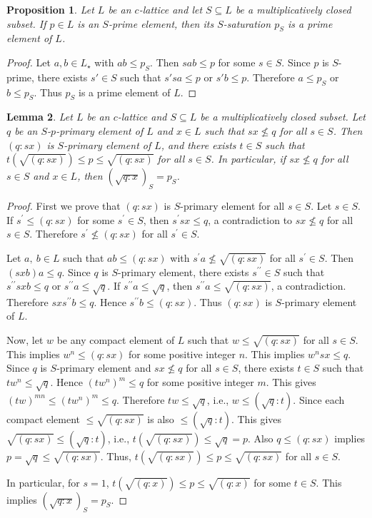 \documentclass[10pt,twoside,a4]{amsart}
\numberwithin{equation}{section}
\theoremstyle{plain}
\newtheorem{lem}{Lemma}[section]
\newtheorem{prop}[lem]{Proposition}
\theoremstyle{definition}
\begin{document}
\begin{prop}\label{ps-prime}
	Let $L$ be an $c$-lattice and let $S \subseteq L$ be a multiplicatively closed subset. If $p \in L$ is an $S$-prime element, then its $S$-saturation $p_S$ is a prime element of $L$.
\end{prop}
\begin{proof}
	Let $a,b\in L_{\star}$ with $ab\leq p_S$. Then $sab\leq p$ for some $s\in S$. Since $p$ is $S$-prime, there exists $s'\in S$ such that $s'sa\leq p$ or $s'b\leq p$. Therefore $a\leq p_S$ or $b\leq p_S$. Thus $p_S$ is a prime element of $L$.
\end{proof}


 \begin{lem}\label{radical=ps} 
	Let $L$ be an $c$-lattice and $S \subseteq L$ be a multiplicatively closed subset. Let $q$ be an $S$-$p$-primary element of $L$ and $x\in L$ such that $sx\nleq q$ for all $s\in S$. Then $(q:sx)$ is $S$-primary element of $L$, and there exists $t\in S$ such that $t(\sqrt{(q:sx)})\leq p\leq \sqrt{(q:sx)}$ for all $s\in S$. In particular, if $sx \not\leq q$ for all $s \in S$ and $x\in L$, then
	$(\sqrt{q : x})_S = p_S$.
\end{lem}

\begin{proof} 
	First we prove that $(q:sx)$ is $S$-primary element for all $s\in S$. Let $s\in S$. If $s^{\prime}\leq (q:sx)$ for some $s^{\prime}\in S$, then $s^{\prime}sx\leq q$, a contradiction to $sx\nleq q$ for all $s\in S$. Therefore $s^{\prime}\nleq (q:sx)$ for all $s^{\prime}\in S$. 
	
	Let $a, ~b \in L$ such that  $ab\leq (q:sx)$ with $s^{\prime}a\nleq \sqrt{(q:sx)}$ for all $s^{\prime}\in S$. Then $(sxb)a\leq q$. Since $q$ is \linebreak $S$-primary element, there exists $s^{\prime\prime}\in S$ such that $s^{\prime\prime}sxb\leq q$ or $s^{\prime\prime}a\leq \sqrt{q}$. If $s^{\prime\prime}a\leq \sqrt{q}$, then $s^{\prime\prime}a\leq \sqrt{(q:sx)}$, a contradiction. Therefore $sxs^{\prime\prime}b \leq q$. Hence $s^{\prime\prime}b\leq (q:sx)$. Thus $(q:sx)$ is $S$-primary element of $L$. 
	
	Now, let $w$ be any compact element of $ L$ such that  $w\leq \sqrt{(q:sx)}$ for all $s \in S$. This implies $w^n\leq (q:sx)$ for some positive integer $n$. This implies $w^nsx\leq q$. Since $q$ is $S$-primary element and $sx\nleq q$ for all $s\in S$, there exists $t\in S$ such that $tw^n\leq \sqrt{q}$. Hence $(tw^n)^m\leq q$ for some positive integer $m$. This gives $(tw)^{mn}\leq (tw^n)^m\leq q$. Therefore $tw\leq \sqrt{q}$, i.e.,  $w \leq (\sqrt{q} : t)$. Since each compact element $\leq \sqrt{(q:sx)} $ is also $\leq (\sqrt{q} : t) $.  This gives $ \sqrt{(q:sx)} \leq (\sqrt{q} : t) $, i.e., $t(\sqrt{(q:sx)})\leq \sqrt{q}=p$. Also $q\leq (q:sx)$ implies $p=\sqrt{q}\leq \sqrt{(q:sx)}$. Thus, $t(\sqrt{(q:sx)})\leq p\leq \sqrt{(q:sx)}$ for all $s\in S$.	
	
	In particular, for $s=1$, $t(\sqrt{(q:x)})\leq p\leq \sqrt{(q:x)}$ for some $t\in S$. This implies $(\sqrt{q : x})_S = p_S$.
\end{proof}
\end{document}
